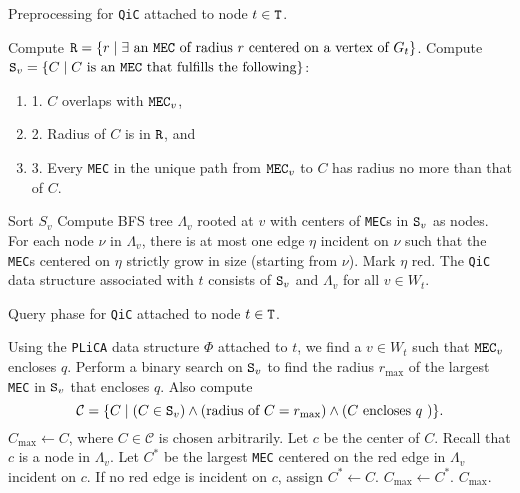 \documentclass[12pt]{llncs}
\begin{document}
\begin{algorithm}[h!]
\caption{Preprocessing for {\tt QiC} attached to node $t \in {\tt T}$.}
\label{alg:qicprep}
\begin{algorithmic}[1]
\STATE Compute ${\tt R} = \{r \mid \exists \text{ an {\tt MEC} of radius $r$ centered on a vertex of $G_t$}\}$.
\STATE Compute ${\tt S}_v = \{C \mid \text{$C$ is an {\tt MEC} that fulfills the following}\}$:
\begin{enumerate}
\item[] 1. $C$ overlaps with ${\tt MEC}_v$,
\item[] 2. Radius of $C$ is in ${\tt R}$, and
\item[] 3. Every {\tt MEC} in the unique path from ${\tt MEC}_v$ to $C$ has radius no more than that of $C$.
\end{enumerate}
\STATE Sort $S_v$
\STATE Compute BFS tree $\Lambda_v$ rooted at $v$ with centers of {\tt MEC}s  in ${\tt S}_v$ as nodes.
\STATE For each node $\nu$ in $\Lambda_v$, there is at most one edge $\eta$ incident on $\nu$ such that the {\tt MEC}s centered on $\eta$ strictly grow in size (starting from $\nu$). Mark $\eta$ red.
\ENDFOR
\STATE The {\tt QiC} data structure associated with $t$ consists of  ${\tt S}_v$ and $\Lambda_v$ for all $v \in W_t$.
\end{algorithmic}
\end{algorithm}

\begin{algorithm}[h!]
\caption{Query phase for {\tt QiC} attached to node $t \in {\tt T}$.}
\label{alg:qicquery}
\begin{algorithmic}[1]
\STATE Using the {\tt PLiCA} data structure $\Phi$ attached to $t$, we find a $v \in W_t$  such that ${\tt MEC}_v$ encloses $q$.
\STATE Perform a binary search on ${\tt S}_v$ to find the radius $r_\text{max}$ of the largest {\tt MEC} in ${\tt S}_v$ that encloses $q$. Also compute  \[\mathcal{C} = \{C \mid (C \in {\tt S}_v) \wedge (\text{radius of } C = r_\text{max}) \wedge (C \text{ encloses $q$ }) \}.\]
\STATE $C_{\text{max}} \leftarrow C$, where $C \in \mathcal{C}$ is chosen arbitrarily.
\STATE Let $c$ be the center of $C$. Recall that $c$ is a node in $\Lambda_v$.
\STATE Let $C^*$ be the largest {\tt MEC} centered on the red edge in $\Lambda_v$ incident on $c$. If no red edge is incident on $c$, assign $C^* \leftarrow C$.
\STATE $C_{\text{max}} \leftarrow C^*$.
\ENDIF
\ENDFOR
\RETURN $C_{\text{max}}$.
\end{algorithmic}
\end{algorithm}
\end{document}
